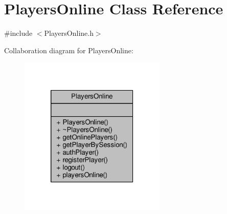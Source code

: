 \hypertarget{class_players_online}{\section{Players\-Online Class Reference}
\label{class_players_online}
}


{\ttfamily \#include $<$Players\-Online.\-h$>$}



Collaboration diagram for Players\-Online\-:
\nopagebreak
\begin{figure}[H]
\begin{center}
\leavevmode
\includegraphics[width=198pt]{class_players_online__coll__graph}
\end{center}
\end{figure}
